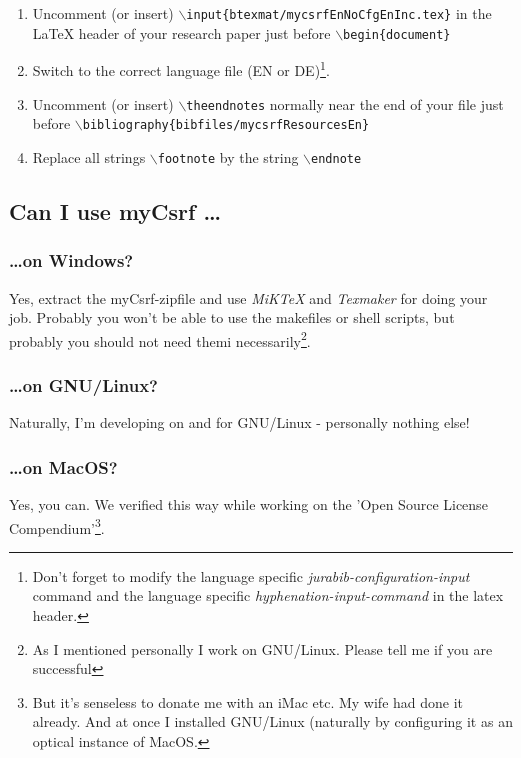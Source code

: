 \documentclass[
  DIV=calc,
  BCOR=5mm,
  11pt,
  headings=small,
  oneside,
  abstract=true,
  toc=bib,
  ngerman,english]{scrartcl}
\begin{document}
\begin{enumerate}
  \item Uncomment (or insert) 
  \texttt{$\backslash$input\{btexmat/mycsrfEnNoCfgEnInc.tex\}} in the LaTeX header of
  your research paper just before \texttt{$\backslash$begin\{document\}}
  \item Switch to the correct language file (EN or DE)\footnote{Don't forget to
  modify the language specific \textit{jurabib-configuration-input} command and the language
  specific \textit{hyphenation-input-command} in the latex header.}.
  \item Uncomment (or insert) \texttt{$\backslash$theendnotes}
  normally near the end of your file just before
  \texttt{$\backslash$bibliography\{bibfiles/mycsrfResourcesEn\}}
  \item Replace all strings \texttt{$\backslash$footnote} by the string
  \texttt{$\backslash$endnote}
\end{enumerate}



\subsection{Can I use myCsrf \ldots}
\subsubsection{\ldots on Windows?}
Yes, extract the myCsrf-zipfile and use \textit{MiKTeX} and
\textit{Texmaker} for doing your job. Probably you won't be able to use the
makefiles or shell scripts, but probably you should not need 
themi necessarily\footnote{As I mentioned
personally I work on GNU/Linux. Please tell me if you are successful}.

\subsubsection{\ldots on GNU/Linux?}
Naturally, I'm developing on and for GNU/Linux - personally nothing else!

\subsubsection{\ldots on MacOS?}
Yes, you can. We verified this way while working on the 'Open Source
License Compendium'\footnote{But it's senseless to donate me with an iMac etc.
My wife had done it already. And at once I installed GNU/Linux (naturally 
by configuring it as an
optical instance of MacOS.}.
\end{document}
